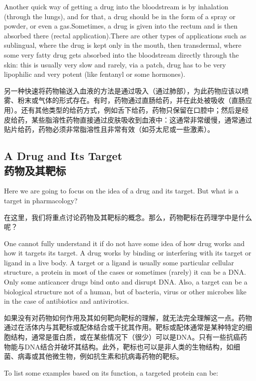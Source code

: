 \documentclass[dvipsnames, svgnames,a4paper,11pt]{article}
\begin{document}
Another quick way of getting a drug into the bloodstream is by inhalation (through the lungs), and for that, a drug should be in the form of a spray or powder, or even a gas.Sometimes, a drug is given into the rectum and is then absorbed there (rectal application).There are other types of applications such as sublingual, where the drug is kept only in the mouth, then transdermal, where some very fatty drug gets absorbed into the bloodstream directly through the skin: this is usually very slow and rarely, via a patch, drug has to be very lipophilic and very potent (like fentanyl or some hormones).

另一种快速将药物输送入血液的方法是通过吸入（通过肺部），为此药物应该以喷雾、粉末或气体的形式存在。有时，药物通过直肠给药，并在此处被吸收（直肠应用）。还有其他类型的给药方式，例如舌下给药，药物只保留在口腔中；然后是经皮给药，某些脂溶性药物直接通过皮肤吸收到血液中：这通常非常缓慢，通常通过贴片给药，药物必须非常脂溶性且非常有效（如芬太尼或一些激素）。

\subsection{A Drug and Its Target\\药物及其靶标}

Here we are going to focus on the idea of a drug and its target. But what is a target in pharmacology?

在这里，我们将重点讨论药物及其靶标的概念。那么，药物靶标在药理学中是什么呢？

One cannot fully understand it if do not have some idea of how drug works and how it targets its target. A drug works by binding or interfering with its target or ligand in a live body. A target or a ligand is usually some particular cellular structure, a protein in most of the cases or sometimes (rarely) it can be a DNA. Only some anticancer drugs bind onto and disrupt DNA. Also, a target can be a biological structure not of a human, but of bacteria, virus or other microbes like in the case of antibiotics and antivirotics.

如果没有对药物如何作用及其如何靶向靶标的理解，就无法完全理解这一点。药物通过在活体内与其靶标或配体结合或干扰其作用。靶标或配体通常是某种特定的细胞结构，通常是蛋白质，或在某些情况下（很少）可以是DNA。只有一些抗癌药物能与DNA结合并破坏其结构。此外，靶标也可以是非人类的生物结构，如细菌、病毒或其他微生物，例如抗生素和抗病毒药物的靶标。

To list some examples based on its function, a targeted protein can be:
\end{document}

